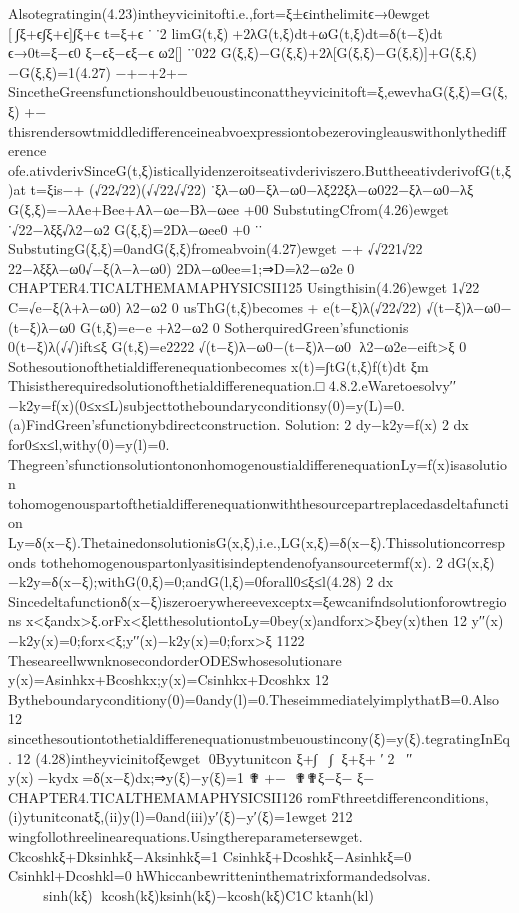{{{{{{Alsotegratingin(4.23)intheyvicinitofti.e.,fort=ξ±ϵinthelimitϵ→0ewget
[∫ξ+ϵ∫ξ+ϵ]∫ξ+ϵ
t=ξ+ϵ
˙˙2
limG(t,ξ)+2λG(t,ξ)dt+ωG(t,ξ)dt=δ(t−ξ)dt
ϵ→0t=ξ−ϵ0
ξ−ϵξ−ϵξ−ϵ
ω2[]
˙˙022
G(ξ,ξ)−G(ξ,ξ)+2λ[G(ξ,ξ)−G(ξ,ξ)]+G(ξ,ξ)−G(ξ,ξ)=1(4.27)
−+−+2+−
SincetheGreensfunctionshouldbeuoustinconattheyvicinitoft=ξ,ewevhaG(ξ,ξ)=G(ξ,ξ)
+−
thisrendersowtmiddledifferenceineabvoexpressiontobezerovingleauswithonlythedifference
ofe.ativderivSinceG(t,ξ)isticallyidenzeroitseativderiviszero.ButtheeativderivofG(t,ξ)at
t=ξis−+
(√22√22)(√√22√√22)
˙ξλ−ω0−ξλ−ω0−λξ22ξλ−ω022−ξλ−ω0−λξ
G(ξ,ξ)=−λAe+Bee+Aλ−ωe−Bλ−ωee
+00
SubstutingCfrom(4.26)ewget
˙√22−λξξ√λ2−ω2
G(ξ,ξ)=2Dλ−ωee0
+0
˙˙
SubstutingG(ξ,ξ)=0andG(ξ,ξ)fromeabvoin(4.27)ewget
−+
√√221√22
22−λξξλ−ω0√−ξ(λ−λ−ω0)
2Dλ−ω0ee=1;⇒D=λ2−ω2e
0
CHAPTER4.TICALTHEMAMAPHYSICSII125
Usingthisin(4.26)ewget
1√22
C=√e−ξ(λ+λ−ω0)
λ2−ω2
0
usThG(t,ξ)becomes
+
e(t−ξ)λ(√22√22)
√(t−ξ)λ−ω0−(t−ξ)λ−ω0
G(t,ξ)=e−e
+λ2−ω2
0
SotherquiredGreen’sfunctionis


0(t−ξ)λ(√√)ift≤ξ
G(t,ξ)=e2222
√(t−ξ)λ−ω0−(t−ξ)λ−ω0
λ2−ω2e−eift>ξ
0
Sothesoutionofthetialdifferenequationbecomes
x(t)=∫tG(t,ξ)f(t)dt
ξm
Thisistherequiredsolutionofthetialdifferenequation.□
4.8.2.eWaretoesolvy′′−k2y=f(x)(0≤x≤L)subjecttotheboundaryconditionsy(0)=y(L)=0.
(a)FindGreen’sfunctionybdirectconstruction.
Solution:
2
dy−k2y=f(x)
2
dx
for0≤x≤l,withy(0)=y(l)=0.
Thegreen’sfunctionsolutiontononhomogenoustialdifferenequationLy=f(x)isasolution
tohomogenouspartofthetialdifferenequationwiththesourcepartreplacedasdeltafunction
Ly=δ(x−ξ).ThetainedonsolutionisG(x,ξ),i.e.,LG(x,ξ)=δ(x−ξ).Thissolutioncorresponds
tothehomogenouspartonlyasitisindeptendenofyansourcetermf(x).
2
dG(x,ξ)−k2y=δ(x−ξ);withG(0,ξ)=0;andG(l,ξ)=0forall0≤ξ≤l(4.28)
2
dx
Sincedeltafunctionδ(x−ξ)iszeroerywhereevexceptx=ξewcanifndsolutionforowtregions
x<ξandx>ξ.orFx<ξletthesolutiontoLy=0bey(x)andforx>ξbey(x)then
12
y′′(x)−k2y(x)=0;forx<ξ;y′′(x)−k2y(x)=0;forx>ξ
1122
TheseareellwwnknosecondorderODESwhosesolutionare
y(x)=Asinhkx+Bcoshkx;y(x)=Csinhkx+Dcoshkx
12
Bytheboundaryconditiony(0)=0andy(l)=0.TheseimmediatelyimplythatB=0.Also
12
sincethesoutiontothetialdifferenequationustmbeuoustincony(ξ)=y(ξ).tegratingInEq.
12
(4.28)intheyvicinitofξewget
0Byytunitcon
ξ+∫✟✯∫
ξ+ξ+
′2✟✟′′
y(x)−kydx=δ(x−ξ)dx;⇒y(ξ)−y(ξ)=1
✟+−
✟✟ξ−ξ−
ξ−
CHAPTER4.TICALTHEMAMAPHYSICSII126
romFthreetdifferenconditions,(i)ytunitconatξ,(ii)y(l)=0and(iii)y′(ξ)−y′(ξ)=1ewget
212
wingfollothreelinearequations.Usingthereparametersewget.
Ckcoshkξ+Dksinhkξ−Aksinhkξ=1
Csinhkξ+Dcoshkξ−Asinhkξ=0
Csinhkl+Dcoshkl=0
hWhiccanbewritteninthematrixformandedsolvas.
sinh(kξ)
kcosh(kξ)ksinh(kξ)−kcosh(kξ)C1Cktanh(kl)
}}}}}}
